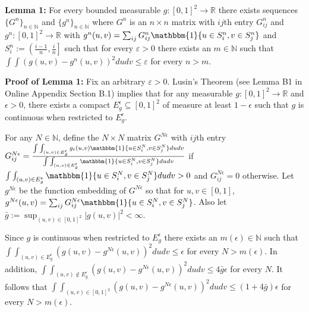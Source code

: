 \documentclass[12pt]{article}
\theoremstyle{definition}
\begin{document}
\begin{flushleft}
\textbf{Lemma 1:} For every bounded measurable $g: [0,1]^{2} \to \mathbb{R}$ there exists sequences $\{G^{n}\}_{n \in \mathbb{N}}$ and $\{g^{n}\}_{n \in \mathbb{N}}$ where $G^{n}$ is an $n\times n$ matrix with $ij$th entry $G^{n}_{ij}$ and $g^{n}:[0,1]^{2}\to\mathbb{R}$ with $g^{n}(u,v) = \sum_{ij}G_{ij}^{n}\mathbbm{1}\{u \in S_{i}^{n}, v \in S_{j}^{n}\}$ and $S_{i}^{n} := \left(\frac{i-1}{n},\frac{i}{n}\right]$ such that for every $\varepsilon > 0$ there exists an $m \in \mathbb{N}$ such that $\int\int\left(g(u,v)-g^{n}(u,v)\right)^{2}dudv \leq \varepsilon$ for every $n > m$.  
\end{flushleft}

\begin{flushleft}
\textbf{Proof of Lemma 1:} Fix an arbitrary $\varepsilon > 0$. Lusin's Theorem (see Lemma B1 in Online Appendix Section B.1) implies that for any measurable $g: [0,1]^{2} \to \mathbb{R}$ and $\epsilon > 0$, there exists a compact $E^{\epsilon}_{g} \subseteq [0,1]^{2}$ of measure at least $1-\epsilon$ such that $g$ is continuous when restricted to $E^{\epsilon}_{g}$.  \newline

For any $N \in \mathbb{N}$, define the $N\times N$ matrix  $G^{N\epsilon}$ with $ij$th entry $G_{ij}^{N\epsilon} = \frac{\int\int_{(u,v) \in E^{\epsilon}_{g}} g_{t}(u,v)\mathbbm{1}\{u \in S_{i}^{N}, v \in S_{j}^{N}\}dudv}{\int\int_{(u,v) \in E^{\epsilon}_{g}}\mathbbm{1}\{u \in S_{i}^{N}, v \in S_{j}^{N}\}dudv}$  if $\int\int_{(u,v) \in E^{\epsilon}_{g}}\mathbbm{1}\{u \in S_{i}^{N}, v \in S_{j}^{N}\}dudv > 0$ and $G_{ij}^{N\epsilon} = 0$ otherwise. Let $g^{N\epsilon}$ be the function embedding of $G^{N\epsilon}$ so that for $u,v \in [0,1]$, $g^{N\epsilon}(u,v) = \sum_{ij}G_{ij}^{N\epsilon}\mathbbm{1}\{u \in S_{i}^{N}, v \in S_{j}^{N}\}$. Also let  $\bar{g} := \sup_{(u,v) \in [0,1]^{2}}|g(u,v)|^{2} < \infty$. \newline %

Since $g$ is continuous when restricted to $E^{\epsilon}_{g}$ there exists an $m(\epsilon) \in \mathbb{N}$ such that $\int\int_{(u,v) \in E^{ \epsilon}_{g}}\left(g(u,v) - g^{N\epsilon}(u,v)\right)^{2}dudv \leq \epsilon$ for every $N > m(\epsilon)$. In addition, $\int\int_{(u,v) \not\in E^{\epsilon}_{g}}\left(g(u,v) - g^{N\epsilon}(u,v)\right)^{2}dudv \leq 4\bar{g}\epsilon$  for every $N$. It follows that $\int\int_{(u,v) \in [0,1]^{2}}\left(g(u,v) - g^{N\epsilon}(u,v)\right)^{2}dudv \leq \left(1+4\bar{g}\right)\epsilon$  for every $N > m(\epsilon)$.  \newline


\end{flushleft}
\end{document}
